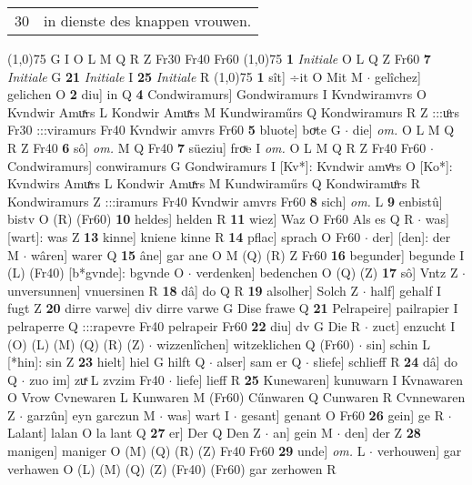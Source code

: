 \documentclass[8pt,a4paper,notitlepage]{article}
\begin{document}
\begin{table}[ht]
\begin{minipage}[t]{0.5\linewidth}
\begin{tabular}{rl}
30 & in dienste des knappen vrouwen.\\ 
\end{tabular}
\scriptsize
\line(1,0){75} \newline
G I O L M Q R Z Fr30 Fr40 Fr60 \newline
\line(1,0){75} \newline
\textbf{1} \textit{Initiale} O L Q Z Fr60  \textbf{7} \textit{Initiale} G  \textbf{21} \textit{Initiale} I  \textbf{25} \textit{Initiale} R  \newline
\line(1,0){75} \newline
\textbf{1} sît] ÷it O Mit M  $\cdot$ gelîchez] gelichen O \textbf{2} diu] in Q \textbf{4} Condwiramurs] Gondwiramurs I Kvndwiramvrs O Kvndwir Amuͯrs L Kondwir Amuͯrs M Kundwiraműrs Q Kondwiramurs R Z :::uͦrs Fr30 :::viramurs Fr40 Kvndwir amvrs Fr60 \textbf{5} bluote] boͮte G  $\cdot$ die] \textit{om.} O L M Q R Z Fr40 \textbf{6} sô] \textit{om.} M Q Fr40 \textbf{7} süeziu] froͮe I \textit{om.} O L M Q R Z Fr40 Fr60  $\cdot$ Condwiramurs] conwiramurs G Gondwiramurs I [Kv*]: Kvndwir amvͦrs O [Ko*]: Kvndwirs Amuͯrs L Kondwir Amuͯrs M Kundwiraműrs Q Kondwiramuͦrs R Kondwiramurs Z :::iramurs Fr40 Kvndwir amvrs Fr60 \textbf{8} sich] \textit{om.} L \textbf{9} enbistû] bistv O (R) (Fr60) \textbf{10} heldes] helden R \textbf{11} wiez] Waz O Fr60 Als es Q R  $\cdot$ was] [wart]: was Z \textbf{13} kinne] kniene kinne R \textbf{14} pflac] sprach O Fr60  $\cdot$ der] [den]: der M  $\cdot$ wâren] warer Q \textbf{15} âne] gar ane O M (Q) (R) Z Fr60 \textbf{16} begunder] begunde I (L) (Fr40) [b*gvnde]: bgvnde  O  $\cdot$ verdenken] bedenchen O (Q) (Z) \textbf{17} sô] Vntz Z  $\cdot$ unversunnen] vnuersinen R \textbf{18} dâ] do Q R \textbf{19} alsolher] Solch Z  $\cdot$ half] gehalf I fugt Z \textbf{20} dirre varwe] div dirre varwe G Dise frawe Q \textbf{21} Pelrapeire] pailrapier I pelraperre Q :::rapevre Fr40 pelrapeir Fr60 \textbf{22} diu] dv G Die R  $\cdot$ zuct] enzucht I (O) (L) (M) (Q) (R) (Z)  $\cdot$ wizzenlîchen] witzeklichen Q (Fr60)  $\cdot$ sin] schin L [*hin]: sin Z \textbf{23} hielt] hiel G hilft Q  $\cdot$ alser] sam er Q  $\cdot$ sliefe] schlieff R \textbf{24} dâ] do Q  $\cdot$ zuo im] zuͯ L zvzim Fr40  $\cdot$ liefe] lieff R \textbf{25} Kunewaren] kunuwarn I Kvnawaren O Vrow Cvnewaren L Kunwaren M (Fr60) Cűnwaren Q Cunwaren R Cvnnewaren Z  $\cdot$ garzûn] eyn garczun M  $\cdot$ was] wart I  $\cdot$ gesant] genant O Fr60 \textbf{26} gein] ge R  $\cdot$ Lalant] lalan O la lant Q \textbf{27} er] Der Q Den Z  $\cdot$ an] gein M  $\cdot$ den] der Z \textbf{28} manigen] maniger O (M) (Q) (R) (Z) Fr40 Fr60 \textbf{29} unde] \textit{om.} L  $\cdot$ verhouwen] gar verhawen O (L) (M) (Q) (Z) (Fr40) (Fr60) gar zerhowen R \newline

\end{minipage}
\end{table}
\end{document}
